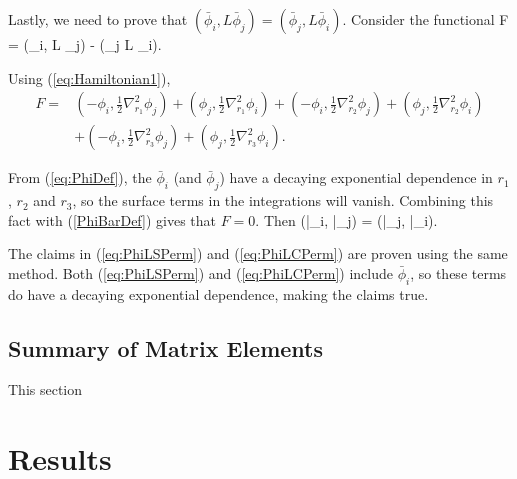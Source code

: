 \documentclass[Dissertation.tex]{subfiles}
\begin{document}
Lastly, we need to prove that $\left(\bar{\phi}_i, L \bar{\phi}_j\right) = \left(\bar{\phi}_j, L \bar{\phi}_i\right)$.  Consider the functional
\beq
F = (\phi_i, L \phi_j) - (\phi_j L \phi_i).
\eeq

Using (\ref{eq:Hamiltonian1}),
\begin{align}
	F=&\left({-\phi_i,{\frac {1}{2}{\nabla }_{{r}_{1}}^{2}\phi_j}}\right)+\left({\phi_j,{\frac {1}{2}{\nabla }_{{r}_{1}}^{2}\phi_i}}\right)+
	\left({-\phi_i,{\frac {1}{2}{\nabla }_{{r}_{2}}^{2}\phi_j}}\right)+\left({\phi_j,{\frac {1}{2}{\nabla }_{{r}_{2}}^{2}\phi_i}}\right) \nonumber \\
	&+\left({-\phi_i,{\frac {1}{2}{\nabla }_{{r}_{3}}^{2}\phi_j}}\right)+\left({\phi_j,{\frac {1}{2}{\nabla }_{{r}_{3}}^{2}\phi_i}}\right).
\end{align}

From (\ref{eq:PhiDef}), the $\bar{\phi}_i$ (and $\bar{\phi}_j$) have a decaying exponential dependence in $r_1$, $r_2$ and $r_3$, so the surface terms in the integrations will vanish.  Combining this fact with (\ref{PhiBarDef}) gives that $F = 0$.  Then
\beq
\left(\bar{\phi}_i,  \bar{\phi}_j\right) = \left(\bar{\phi}_j,  \bar{\phi}_i\right).
\label{PhiLPhiPerm}
\eeq

The claims in (\ref{eq:PhiLSPerm}) and (\ref{eq:PhiLCPerm}) are proven using the same method.  Both (\ref{eq:PhiLSPerm}) and (\ref{eq:PhiLCPerm}) include $\bar{\phi}_i$, so these terms do have a decaying exponential dependence, making the claims true.







\subsection{Summary of Matrix Elements}
\label{SWaveMatrixSummary}
This section 



\section{Results}
\end{document}
